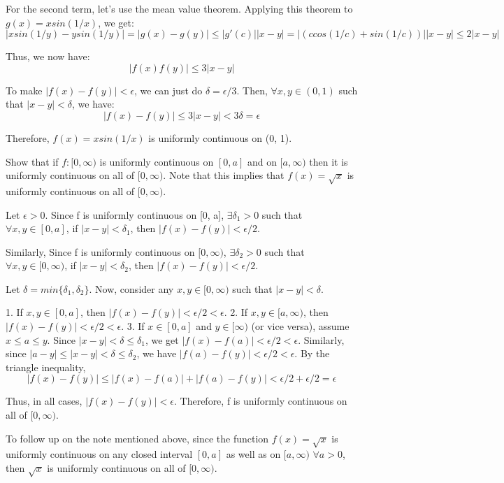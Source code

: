\documentclass[answers]{exam}
\theoremstyle{remark}
\theoremstyle{definition}
\begin{document}
\begin{questions}
\begin{solution}
For the second term, let's use the mean value theorem. Applying this
theorem to $g(x) = x sin(1/x)$, we get:
\[|x sin(1/y) - y sin(1/y)| = |g(x) - g(y)| \leq |g'(c)||x-y| = |(c cos(1/c) + sin(1/c))||x-y| \leq 2|x-y|\]

Thus, we now have:
\[|f(x) f(y)| \leq 3|x-y|\]

To make $|f(x) - f(y)| < \epsilon$, we can just do $\delta = \epsilon/3$.
Then, $\forall x, y \in (0, 1)$ such that $|x-y| < \delta$,
we have:
\[|f(x) - f(y)| \leq 3|x-y| < 3 \delta = \epsilon\]

Therefore, $f(x) = x sin(1/x)$ is uniformly continuous on (0, 1).

\end{solution}

\question 
Show that if $f:[0, \infty)$ is uniformly continuous on $[0,a]$ and on $[a,\infty)$ then it is uniformly continuous on all of $[0, \infty)$. Note that this implies that $f(x)= \sqrt{x}$ is uniformly continuous on all of $[0, \infty)$.
\begin{solution}

Let $\epsilon > 0$. Since f is uniformly continuous on [0, a], $\exists \delta_1 > 0$
such that $\forall x, y \in [0, a]$, if $|x-y| < \delta_1$,
then $|f(x) - f(y)| < \epsilon/2$.

Similarly, Since f is uniformly continuous on $[0, \infty)$, $\exists \delta_2 > 0$
such that $\forall x, y \in [0, \infty)$, if $|x-y| < \delta_2$,
then $|f(x) - f(y)| < \epsilon/2$.

Let $\delta = min\{\delta_1, \delta_2\}$. Now, consider any
$x, y \in [0, \infty)$ such that $|x-y| < \delta$.

1. If $x, y \in [0, a]$, then $|f(x) - f(y)| < \epsilon/2 < \epsilon$.
2. If $x, y \in [a, \infty)$, then $|f(x) - f(y)| < \epsilon/2 < \epsilon$.
3. If $x \in [0, a]$ and $y \in [\infty)$ (or vice versa),
assume $x \leq a \leq y$. Since $|x-y| < \delta \leq \delta_1$, we
get $|f(x)-f(a)| < \epsilon/2 < \epsilon$. Similarly, since
$|a-y| \leq |x-y| < \delta \leq \delta_2$, we have
$|f(a) - f(y)| < \epsilon/2 < \epsilon$. By the triangle inequality,
\[|f(x)-f(y)| \leq |f(x)-f(a)| + |f(a)-f(y)| < \epsilon/2 + \epsilon/2 = \epsilon\]

Thus, in all cases, $|f(x)-f(y)| < \epsilon$.
Therefore, f is uniformly continuous on all of $[0, \infty)$.

To follow up on the note mentioned above, since the function
$f(x) = \sqrt{x}$ is uniformly continuous on any
closed interval $[0, a]$ as well as on $[a, \infty)$
$\forall a > 0$, then $\sqrt{x}$ is uniformly continuous on
all of $[0, \infty)$.

\end{solution}

\end{questions}
\end{document}
